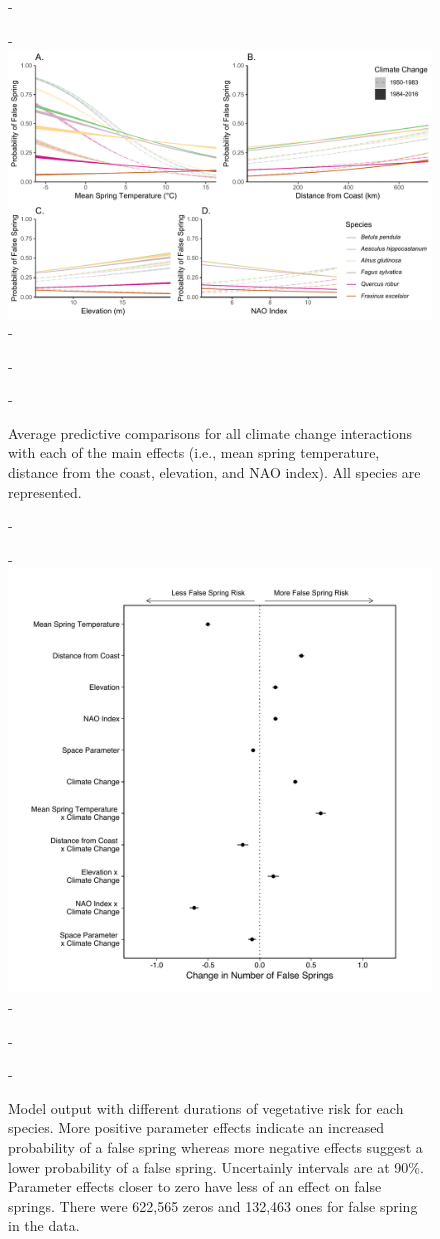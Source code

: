 \documentclass{article}\usepackage[]{graphicx}\usepackage[]{color}
\begin{document}
{\begin{figure} [H]
  -\begin{center}
  -\includegraphics[width=16cm]{..//figures/APC_allpred_allspp_baseR.pdf}
  -\caption{Average predictive comparisons for all climate change interactions with each of the main effects (i.e., mean spring temperature, distance from the coast, elevation, and NAO index). All species are represented. }\label{fig:suppapc}
  -\end{center}
  -\end{figure}}
  
  {\begin{figure} [H]
  -\begin{center}
  -\includegraphics[width=12cm]{..//figures/model_output_dvr_90.pdf}
  -\caption{Model output with different durations of vegetative risk for each species. More positive parameter effects indicate an increased probability of a false spring whereas more negative effects suggest a lower probability of a false spring. Uncertainly intervals are at 90\%. Parameter effects closer to zero have less of an effect on false springs. There were 622,565 zeros and 132,463 ones for false spring in the data.}\label{fig:dvr}
  -\end{center}
  -\end{figure}}
  
\end{document}
